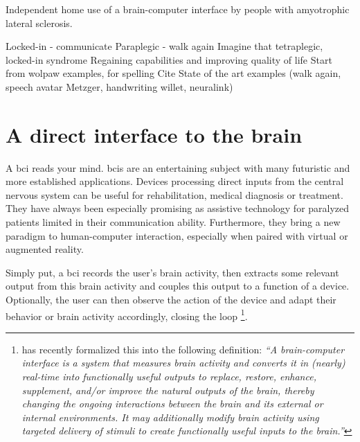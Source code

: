 Independent home use of a brain-computer interface by people with
amyotrophic lateral sclerosis.

Locked-in -\> communicate
Paraplegic -\> walk again
Imagine that
tetraplegic, locked-in syndrome
Regaining capabilities and improving quality of life
Start from wolpaw examples, for spelling
Cite State of the art examples (walk again, speech avatar Metzger, handwriting
willet, neuralink)


\section{A direct interface to the brain}
A \ac{bci} reads your mind.
\ac{bci}s are an entertaining subject with many futuristic and more established
applications.
Devices processing direct inputs from the central nervous system can be
useful for rehabilitation, medical diagnosis or treatment.
They have always been especially promising as assistive technology for
paralyzed patients limited in their communication ability. 
Furthermore, they bring a new paradigm to human-computer interaction,
especially when paired with virtual or augmented reality.

Simply put, a \ac{bci} records the user's brain activity, then extracts some
relevant output from this brain activity and couples this output to a function
of a device.
Optionally, the user can then observe the action of the device and adapt their
behavior or brain activity accordingly, closing the loop
\footnote{
  \textcite{BCISociety2024} has recently formalized this into the
  following definition:
  \it``A brain-computer interface is a system that measures brain activity and
  converts it in (nearly) real-time into functionally useful outputs to replace,
  restore, enhance, supplement, and/or improve the natural outputs of the brain,
  thereby changing the ongoing interactions between the brain and its external or
  internal environments. It may additionally modify brain activity using targeted
  delivery of stimuli to create functionally useful inputs to the
  brain.''
}.

